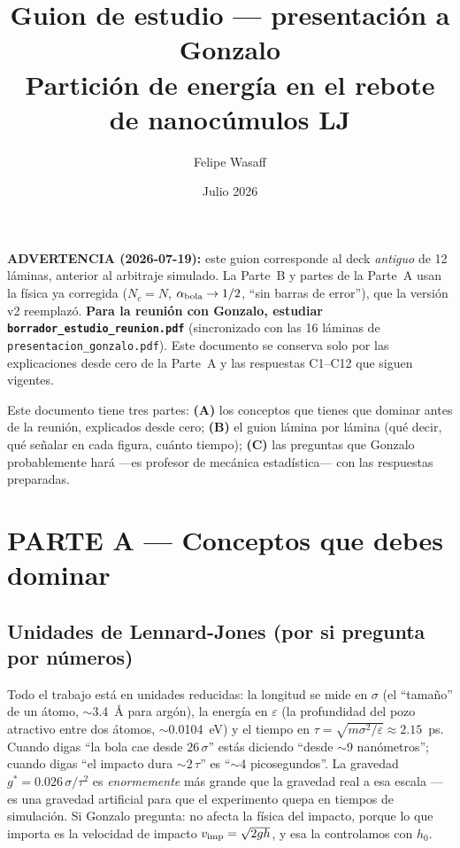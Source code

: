 \documentclass[11pt,a4paper]{article}
\title{\textbf{Guion de estudio --- presentación a Gonzalo}\\
\large Partición de energía en el rebote de nanocúmulos LJ}
\author{Felipe Wasaff}
\date{Julio 2026}
\newcommand{\eps}{\varepsilon}
\newcommand{\gstar}{g^*}
\begin{document}
\maketitle

\begin{mdframed}[backgroundcolor=red!8, linecolor=red!60, linewidth=1.2pt]
\textbf{ADVERTENCIA (2026-07-19):} este guion corresponde al deck
\emph{antiguo} de 12 láminas, anterior al arbitraje simulado. La Parte~B
y partes de la Parte~A usan la física ya corregida
($N_c=N$, $\alpha_{\rm bola}\to1/2$, ``sin barras de error''), que la
versión v2 reemplazó. \textbf{Para la reunión con Gonzalo, estudiar
\texttt{borrador\_estudio\_reunion.pdf}} (sincronizado con las 16 láminas
de \texttt{presentacion\_gonzalo.pdf}). Este documento se conserva solo
por las explicaciones desde cero de la Parte~A y las respuestas C1--C12
que siguen vigentes.
\end{mdframed}

\noindent Este documento tiene tres partes: \textbf{(A)} los conceptos que
tienes que dominar antes de la reunión, explicados desde cero;
\textbf{(B)} el guion lámina por lámina (qué decir, qué señalar en cada
figura, cuánto tiempo); \textbf{(C)} las preguntas que Gonzalo
probablemente hará ---es profesor de mecánica estadística--- con las
respuestas preparadas.

\tableofcontents

\section{PARTE A --- Conceptos que debes dominar}

\subsection{Unidades de Lennard-Jones (por si pregunta por números)}

Todo el trabajo está en unidades reducidas: la longitud se mide en
$\sigma$ (el ``tamaño'' de un átomo, $\sim$3.4~\AA{} para argón), la
energía en $\eps$ (la profundidad del pozo atractivo entre dos átomos,
$\sim$0.0104~eV) y el tiempo en $\tau=\sqrt{m\sigma^2/\eps}\approx2.15$~ps.
Cuando digas ``la bola cae desde $26\,\sigma$'' estás diciendo ``desde
$\sim$9 nanómetros''; cuando digas ``el impacto dura $\sim2\,\tau$'' es
``$\sim$4 picosegundos''. La gravedad $\gstar=0.026\,\sigma/\tau^2$ es
\emph{enormemente} más grande que la gravedad real a esa escala --- es una
gravedad artificial para que el experimento quepa en tiempos de
simulación. Si Gonzalo pregunta: no afecta la física del impacto, porque
lo que importa es la velocidad de impacto $v_{\rm imp}=\sqrt{2gh}$, y esa
la controlamos con $h_0$.
\end{document}
